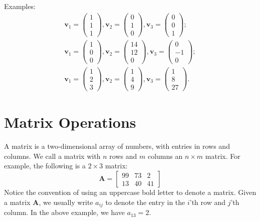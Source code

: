 \documentclass[
  12pt,
  oneside,openany]{book}
\begin{document}
Examples:
\[
\begin{gathered}
\mathbf{v}_1 = \begin{pmatrix} 1 \\ 1 \\ 1 \end{pmatrix},
\mathbf{v}_2 = \begin{pmatrix} 0 \\ 1 \\ 0 \end{pmatrix},
\mathbf{v}_3 = \begin{pmatrix} 0 \\ 0 \\ 1 \end{pmatrix}; \\
\mathbf{v}_1 = \begin{pmatrix} 1 \\ 0 \\ 0 \end{pmatrix},
\mathbf{v}_2 = \begin{pmatrix} 14 \\ 12 \\ 0 \end{pmatrix},
\mathbf{v}_3 = \begin{pmatrix} 0 \\ -1 \\ 0 \end{pmatrix}; \\
\mathbf{v}_1 = \begin{pmatrix} 1 \\ 2 \\ 3 \end{pmatrix},
\mathbf{v}_2 = \begin{pmatrix} 1 \\ 4 \\ 9 \end{pmatrix},
\mathbf{v}_3 = \begin{pmatrix} 1 \\ 8 \\ 27 \end{pmatrix}.
\end{gathered}
\]

\hypertarget{matrix-operations}{%
\section{Matrix Operations}\label{matrix-operations}}

A matrix is a two-dimensional array of numbers, with entries in rows and columns. We call a matrix with \(n\) rows and \(m\) columns an \(n \times m\) matrix. For example, the following is a \(2 \times 3\) matrix:
\[
\mathbf{A}
=
\begin{bmatrix}
  99 & 73 & 2 \\
  13 & 40 & 41
\end{bmatrix}
\]
Notice the convention of using an uppercase bold letter to denote a matrix. Given a matrix \(\mathbf{A}\), we usually write \(a_{ij}\) to denote the entry in the \(i\)'th row and \(j\)'th column. In the above example, we have \(a_{13} = 2\).
\end{document}
